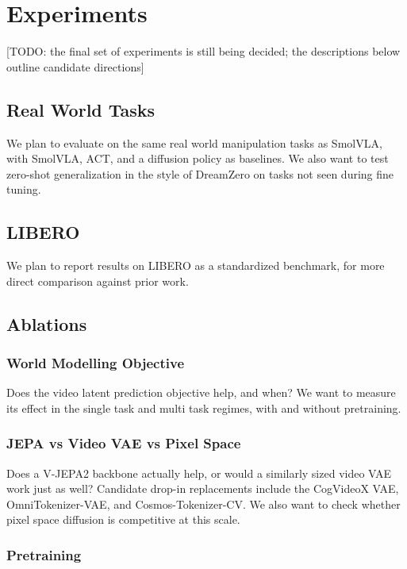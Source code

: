 \section{Experiments}

[TODO: the final set of experiments is still being decided; the descriptions below outline candidate directions]

\subsection{Real World Tasks}

We plan to evaluate on the same real world manipulation tasks as SmolVLA, with SmolVLA, ACT, and a diffusion policy as baselines. We also want to test zero-shot generalization in the style of DreamZero on tasks not seen during fine tuning.

\subsection{LIBERO}

We plan to report results on LIBERO as a standardized benchmark, for more direct comparison against prior work.

\subsection{Ablations}

\subsubsection{World Modelling Objective}

Does the video latent prediction objective help, and when? We want to measure its effect in the single task and multi task regimes, with and without pretraining.

\subsubsection{JEPA vs Video VAE vs Pixel Space}

Does a V-JEPA2 backbone actually help, or would a similarly sized video VAE work just as well? Candidate drop-in replacements include the CogVideoX VAE, OmniTokenizer-VAE, and Cosmos-Tokenizer-CV. We also want to check whether pixel space diffusion is competitive at this scale.

\subsubsection{Pretraining}

